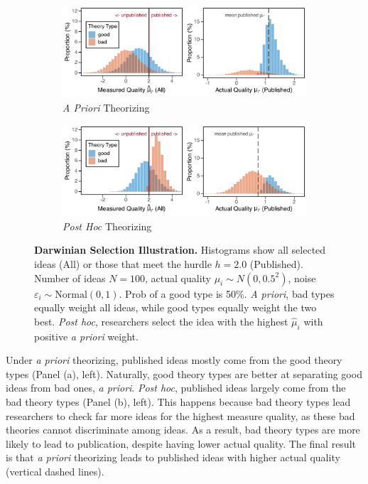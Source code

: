 \documentclass[12pt,english]{article}
\theoremstyle{plain}
\theoremstyle{plain}
\begin{document}
\begin{figure}[h]
    \def\tempwidth{1.0\textwidth}

    \centering
    \begin{subfigure}[b]{\textwidth}
        \centering
        \caption{\emph{A Priori} Theorizing}
        \includegraphics[width=\tempwidth]{many-par0-ap.pdf}
    \end{subfigure}
    
    \vspace{1em}
    
    \begin{subfigure}[b]{\textwidth}
        \centering
        \caption{\emph{Post Hoc} Theorizing}
        \includegraphics[width=\tempwidth]{many-par0-ph.pdf}
    \end{subfigure}
    \caption{
        \textbf{Darwinian Selection Illustration.} Histograms show all selected ideas (All) or those that meet the hurdle $h=2.0$ (Published). Number of ideas $N=100$, actual quality $\mu_i \sim N(0, 0.5^2)$, noise $\varepsilon_i \sim \text{Normal}(0, 1)$. Prob of a good type is 50\%. \emph{A priori}, bad types equally weight all ideas, while good types equally weight the two best. \emph{Post hoc}, researchers select the idea with the highest $\hat{\mu}_i$ with positive \emph{a priori} weight.  
    }
    \label{fig:darwinian_selection}
\end{figure}

Under \emph{a priori} theorizing, published ideas mostly come from the good theory types (Panel (a), left). Naturally, good theory types are better at separating good ideas from bad ones, \emph{a priori}. \emph{Post hoc}, published ideas largely come from the bad theory types (Panel (b), left). This happens because bad theory types lead researchers to check far more ideas for the highest measure quality, as these bad theories cannot discriminate among ideas. As a result, bad theory types are more likely to lead to publication, despite having lower actual quality. The final result is that \emph{a priori} theorizing leads to published ideas with higher actual quality (vertical dashed lines).
\end{document}
